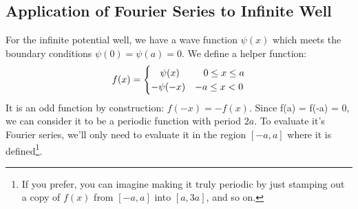 \documentclass[12pt]{book}
\begin{document}
\subsection{Application of Fourier Series to Infinite Well}

For the infinite potential well, we have a wave function $\psi(x)$ which meets the boundary conditions $\psi(0) = \psi(a) = 0$.  We define a helper function:
\begin{equation*}
f(x) = 
\begin{cases}    
  \hspace{9.5pt}\psi(x)  & \hspace{9pt} 0 \leq x \leq a \\
  -\psi(-x) & -a \leq x < 0 \\
\end{cases}   
\end{equation*}
It is an odd function by construction:  $f(-x) = -f(x)$.  Since f(a) = f(-a) = 0, we can consider it to be a periodic function with period $2a$. To evaluate it's Fourier series, we'll only need to evaluate it in the region $[-a,a]$ where it is defined\footnote{If you prefer, you can imagine making it truly periodic by just stamping out a copy of $f(x)$ from $[-a,a]$ into $[a,3a]$, and so on.}.
\end{document}
